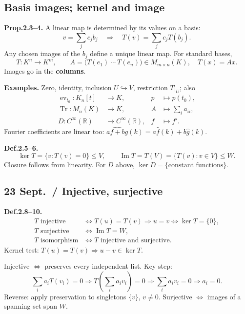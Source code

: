 \documentclass[11pt,letterpaper]{article}
\begin{document}
\newpage

\subsection{Basis images; kernel and
image}\label{basis-images-kernel-and-image}

\textbf{Prop.2.3--4.} A linear map is determined by its values on a
basis: \[
v=\sum_j c_jb_j\quad\Rightarrow\quad T(v)=\sum_j c_jT(b_j).
\] Any chosen images of the \(b_j\) define a unique linear map. For
standard bases, \[
T:K^n\to K^m,\qquad
A=\bigl(T(e_1)\ \cdots\ T(e_n)\bigr)\in M_{m\times n}(K),\quad T(x)=Ax.
\] Images go in the \textbf{columns}.

\textbf{Examples.} Zero, identity, inclusion \(U\hookrightarrow V\),
restriction \(T|_U\); also \[
\begin{aligned}
\operatorname{ev}_{t_0}:K_n[t]&\to K,&p&\mapsto p(t_0),\\
\operatorname{Tr}:M_n(K)&\to K,&A&\mapsto\sum_i a_{ii},\\
D:C^\infty(\mathbb R)&\to C^\infty(\mathbb R),&f&\mapsto f'.
\end{aligned}
\] Fourier coefficients are linear too:
\(\widehat{af+bg}(k)=a\hat f(k)+b\hat g(k)\).

\textbf{Def.2.5--6.} \[
\ker T=\{v:T(v)=0\}\le V,\qquad
\operatorname{Im}T=T(V)=\{T(v):v\in V\}\le W.
\] Closure follows from linearity. For \(D\) above,
\(\ker D=\{\text{constant functions}\}\).

\subsection{23 Sept.~/ Injective,
surjective}\label{sept.-injective-surjective}

\textbf{Def.2.8--10.} \[
\begin{aligned}
T\text{ injective}&\iff T(u)=T(v)\Rightarrow u=v\iff\ker T=\{0\},\\
T\text{ surjective}&\iff\operatorname{Im}T=W,\\
T\text{ isomorphism}&\iff T\text{ injective and surjective}.
\end{aligned}
\] Kernel test: \(T(u)=T(v)\Rightarrow u-v\in\ker T\).

Injective \(\iff\) preserves every independent list. Key step: \[
\sum_i a_iT(v_i)=0\Rightarrow T\!\left(\sum_i a_iv_i\right)=0
\Rightarrow\sum_i a_iv_i=0\Rightarrow a_i=0.
\] Reverse: apply preservation to singletons \(\{v\}\), \(v\ne0\).
Surjective \(\iff\) images of a spanning set span \(W\).
\end{document}
